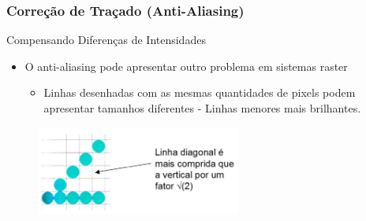 \documentclass{beamer}
\begin{document}
\begin{frame}
\frametitle{Correção de Traçado (Anti-Aliasing)}
	\begin{block}{Compensando Diferenças de Intensidades}
		\begin{itemize}
			\item O anti-aliasing pode apresentar outro problema em sistemas raster
				\begin{itemize}
					\item Linhas desenhadas com as mesmas quantidades de pixels podem apresentar tamanhos diferentes - Linhas menores mais brilhantes.
				\end{itemize}
		\end{itemize}
	\end{block}

	\begin{figure}[!h]
			\begin{center}
				\includegraphics[width=0.6\textwidth]{Figures/ProRas}
			\end{center}
		\end{figure}
\end{frame}


\end{document}
